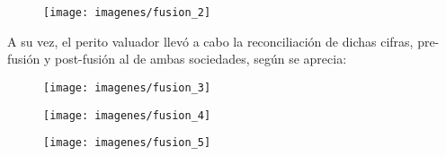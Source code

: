\begin{figure}[H]
\centering
\texttt{[image: imagenes/fusion\_2]}
\end{figure}

A su vez, el perito valuador llev\'o a cabo la reconciliaci\'on de dichas cifras, pre-fusi\'on y post-fusi\'on al \fechaValoreCorto de ambas sociedades, seg\'un se aprecia:

\begin{figure}[H]
\centering
\texttt{[image: imagenes/fusion\_3]}
\end{figure}

\begin{figure}[H]
\centering
\texttt{[image: imagenes/fusion\_4]}
\end{figure}

\begin{figure}[H]
\centering
\texttt{[image: imagenes/fusion\_5]}
\end{figure}






